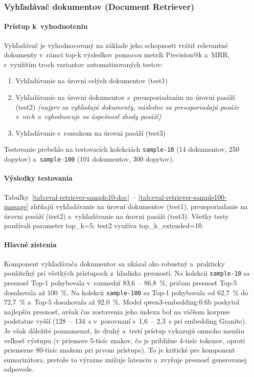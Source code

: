 \subsubsection*{Vyhľadávač dokumentov (Document Retriever)}

\paragraph{Prístup k~vyhodnoteniu}
Vyhľadávač je vyhodnocovaný na základe jeho schopnosti vrátiť relevantné dokumenty v~rámci top-k výsledkov pomocou metrík Precision@k a~MRR, s~využitím troch variantov automatizovaných testov:
\begin{enumerate}
  \item Vyhľadávanie na úrovni celých dokumentov (test1)
  \item Vyhľadávanie na úrovni dokumentov s~preusporiadaním na úrovni pasáží (test2) \textsl{(najprv sa vyhľadajú dokumenty, následne sa preusporiadajú pasáže v~nich a~vyhodnocuje sa úspešnosť zhody pasáží)}
  \item Vyhľadávanie s~rozsahom na úrovni pasáží (test3)
\end{enumerate}
Testovanie prebehlo na testovacích kolekciách \texttt{sample-10} (14 dokumentov, 250 dopytov) a~\texttt{sample-100} (101 dokumentov, 300 dopytov).

\paragraph{Výsledky testovania}{}
Tabuľky~\ref{tab:eval-retriever-sample10-doc}~-- \ref{tab:eval-retriever-sample100-passage} zhŕňajú vyhľadávanie na úrovni dokumentov (test1), preusporiadanie na úrovni pasáží (test2) a~vyhľadávanie na úrovni pasáží (test3). Všetky testy používali parameter top\_k=5; test2 využíva top\_k\_extended=10.

\paragraph{Hlavné zistenia}
Komponent vyhľadávača dokumentov sa ukázal ako robustný a~prakticky použiteľný pri všetkých prístupoch z~hľadiska presnosti. Na kolekcii \texttt{sample-10} sa presnosť Top-1 pohybovala v~rozmedzí 83,6~-- 86,8~\%, pričom presnosť Top-5 dosahovala až 100~\%. Na kolekcii \texttt{sample-100} sa Top-1 pohybovala od 62,7~\% do 72,7~\% a~Top-5 dosahovala až 92,0~\%. Model qwen3-embedding:0.6b poskytol najlepšiu presnosť, avšak čas zostavenia jeho indexu bol na väčšom korpuse podstatne vyšší (128~-- 134~s v~porovnaní s~1,6~-- 2,3~s pri embedding Granite). Je však dôležité poznamenať, že druhý a~tretí prístup vykazujú omnoho menšiu veľkosť výstupu (v priemere 5-tisíc znakov, čo je približne 4-tisíc tokenov, oproti priemerne 80-tisíc znakom pri prvom prístupe). To je kritické pre komponent sumarizátora, pretože to výrazne znižuje latenciu a~zvyšuje presnosť generovanej odpovede.

